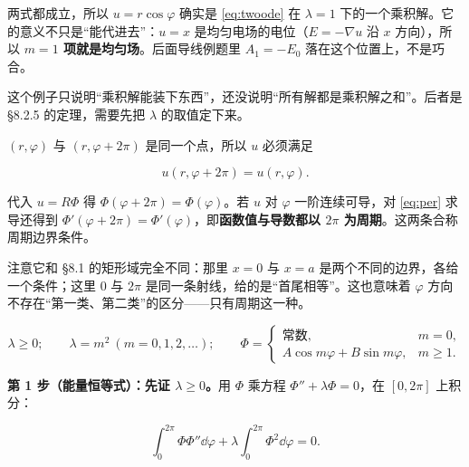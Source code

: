 两式都成立，所以 $u=r\cos\varphi$ 确实是 \eqref{eq:twoode} 在 $\lambda=1$ 下的一个乘积解。它的意义不只是“能代进去”：$u=x$ 是均匀电场的电位（$E=-\nabla u$ 沿 $x$ 方向），所以 \textbf{$m=1$ 项就是均匀场}。后面导线例题里 $A_1=-E_0$ 落在这个位置上，不是巧合。

这个例子只说明“乘积解能装下东西”，还没说明“所有解都是乘积解之和”。后者是 \S8.2.5 的定理，需要先把 $\lambda$ 的取值定下来。


\label{sec:823}



$(r,\varphi)$ 与 $(r,\varphi+2\pi)$ 是同一个点，所以 $u$ 必须满足

\begin{equation}
u(r,\varphi+2\pi)=u(r,\varphi).
\label{eq:per}
\end{equation}

代入 $u=R\Phi$ 得 $\Phi(\varphi+2\pi)=\Phi(\varphi)$。若 $u$ 对 $\varphi$ 一阶连续可导，对 \eqref{eq:per} 求导还得到 $\Phi'(\varphi+2\pi)=\Phi'(\varphi)$，即\textbf{函数值与导数都以 $2\pi$ 为周期}。这两条合称周期边界条件。

注意它和 \S8.1 的矩形域完全不同：那里 $x=0$ 与 $x=a$ 是两个不同的边界，各给一个条件；这里 $0$ 与 $2\pi$ 是同一条射线，给的是“首尾相等”。这也意味着 $\varphi$ 方向不存在“第一类、第二类”的区分——只有周期这一种。



\[
\lambda\ge0;\qquad
\lambda=m^2\ (m=0,1,2,\dots);\qquad
\Phi=\begin{cases}
\text{常数}, & m=0,\\[2pt]
A\cos m\varphi+B\sin m\varphi, & m\ge1.
\end{cases}
\]

\pfline

\textbf{第 1 步（能量恒等式）：先证 $\lambda\ge0$。}用 $\Phi$ 乘方程 $\Phi''+\lambda\Phi=0$，在 $[0,2\pi]$ 上积分：

\[
\int_0^{2\pi}\Phi\Phi''\dd\varphi+\lambda\int_0^{2\pi}\Phi^2\dd\varphi=0 .
\]

